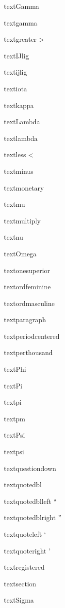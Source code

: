\documentclass{article}
\begin{document}
textGamma    \textGamma{}

textgamma    \textgamma{}

textgreater    \textgreater{}

textIJlig    \textIJlig{}

textijlig    \textijlig{}

textiota    \textiota{}

textkappa    \textkappa{}

textLambda    \textLambda{}

textlambda    \textlambda{}

textless    \textless{}

textminus    \textminus{}

textmonetary    \textmonetary{}

textmu    \textmu{}

textmultiply    \textmultiply{}

textnu    \textnu{}

textOmega    \textOmega{}

textonesuperior    \textonesuperior{}

textordfeminine    \textordfeminine{}

textordmasculine    \textordmasculine{}

textparagraph    \textparagraph{}

textperiodcentered    \textperiodcentered{}

textperthousand    \textperthousand{}

textPhi    \textPhi{}

textPi    \textPi{}

textpi    \textpi{}

textpm    \textpm{}

textPsi    \textPsi{}

textpsi    \textpsi{}

textquestiondown    \textquestiondown{}

textquotedbl    \textquotedbl{}

textquotedblleft    \textquotedblleft{}

textquotedblright    \textquotedblright{}

textquoteleft    \textquoteleft{}

textquoteright    \textquoteright{}

textregistered    \textregistered{}

textsection    \textsection{}

textSigma    \textSigma{}
\end{document}
